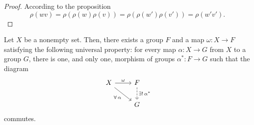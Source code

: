 \begin{proof} According to the proposition
    $$
        \rho(wv) 
        = \rho(\rho(w)\rho(v))
        = \rho(\rho(w')\rho(v'))
        = \rho(w'v').
    $$
\end{proof}


\begin{thm}\label{thm:free-group-universal-property}
    Let\/ $X$ be a nonempty set. Then, there exists a group\/ $F$ and a map\/ $\omega\colon X\to F$ satisfying the following universal property: for every map\/ $\alpha\colon X\to G$ from $X$ to a group $G$, there is one, and only one, morphism of groups\/ $\alpha^*\colon F\to G$ such that the diagram
    $$
        \begin{tikzcd}
            X \arrow[r, "\omega"] \arrow[rd, "\forall\,\alpha"']
                & F \arrow[d, "\exists!\,\alpha^*", dashed] \\
                & G
        \end{tikzcd}
    $$
    commutes.
\end{thm}

